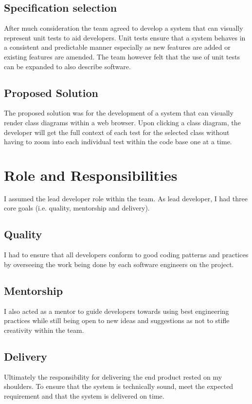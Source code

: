 \documentclass[a4paper,12pt]{article}
\begin{document}
\subsection{Specification selection}
After much consideration the team agreed to develop a system that can visually represent unit tests to aid developers. Unit tests ensure that a system behaves in a consistent and predictable manner especially as new features are added or existing features are amended. The team however felt that the use of unit tests can be expanded to also describe software.  

\subsection{Proposed Solution}
The proposed solution was for the development of a system that can visually render class diagrams within a web browser. Upon clicking a class diagram, the developer will get the full context of each test for the selected class without having to zoom into each individual test within the code base one at a time. 


\section{Role and Responsibilities}
I assumed the lead developer role within the team. As lead developer, I had three core goals (i.e. quality, mentorship and delivery).


\subsection{Quality} 
I had to ensure that all developers conform to good coding patterns and practices by overseeing the work being done by each software engineers on the project.
\subsection{Mentorship} 
I also acted as a mentor to guide developers towards using best engineering practices while still being open to new ideas and suggestions as not to stifle creativity within the team.
\subsection{Delivery} 
Ultimately the responsibility for delivering the end product rested on my shoulders. To ensure that the system is technically sound, meet the expected requirement and that the system is delivered on time. 
\end{document}
